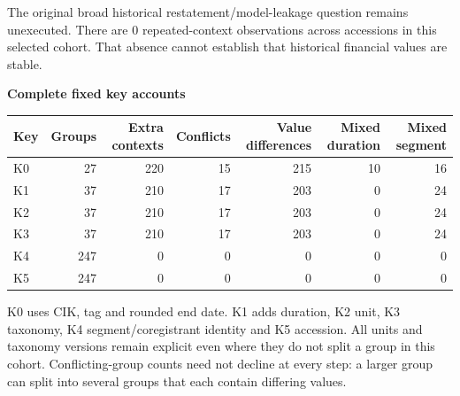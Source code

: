 \documentclass[11pt,letterpaper]{article}
\newcommand{\BoundK}{0}
\newcommand{\BoundL}{27}
\newcommand{\BoundM}{220}
\newcommand{\BoundN}{15}
\newcommand{\BoundO}{215}
\newcommand{\BoundP}{10}
\newcommand{\BoundQ}{16}
\newcommand{\BoundR}{37}
\newcommand{\BoundS}{210}
\newcommand{\BoundT}{17}
\newcommand{\BoundU}{203}
\newcommand{\BoundV}{0}
\newcommand{\BoundW}{24}
\newcommand{\BoundX}{37}
\newcommand{\BoundY}{210}
\newcommand{\BoundZ}{17}
\newcommand{\BoundAA}{203}
\newcommand{\BoundAB}{0}
\newcommand{\BoundAC}{24}
\newcommand{\BoundAD}{37}
\newcommand{\BoundAE}{210}
\newcommand{\BoundAF}{17}
\newcommand{\BoundAG}{203}
\newcommand{\BoundAH}{0}
\newcommand{\BoundAI}{24}
\newcommand{\BoundAJ}{247}
\newcommand{\BoundAK}{0}
\newcommand{\BoundAL}{0}
\newcommand{\BoundAM}{0}
\newcommand{\BoundAN}{0}
\newcommand{\BoundAO}{0}
\newcommand{\BoundAP}{247}
\newcommand{\BoundAQ}{0}
\newcommand{\BoundAR}{0}
\newcommand{\BoundAS}{0}
\newcommand{\BoundAT}{0}
\newcommand{\BoundAU}{0}
\begin{document}
The original broad historical restatement/model-leakage question remains unexecuted. There are \BoundK{} repeated-context observations across accessions in this selected cohort. That absence cannot establish that historical financial values are stable.
\newpage
{\Large\bfseries Complete fixed key accounts\par}
{\small\setlength{\tabcolsep}{5pt}
\begin{tabular}{@{}lrrrrrr@{}}\toprule
Key & Groups & Extra contexts & Conflicts & Value differences & Mixed duration & Mixed segment\\\midrule
K0 & \BoundL{} & \BoundM{} & \BoundN{} & \BoundO{} & \BoundP{} & \BoundQ{} \\
K1 & \BoundR{} & \BoundS{} & \BoundT{} & \BoundU{} & \BoundV{} & \BoundW{} \\
K2 & \BoundX{} & \BoundY{} & \BoundZ{} & \BoundAA{} & \BoundAB{} & \BoundAC{} \\
K3 & \BoundAD{} & \BoundAE{} & \BoundAF{} & \BoundAG{} & \BoundAH{} & \BoundAI{} \\
K4 & \BoundAJ{} & \BoundAK{} & \BoundAL{} & \BoundAM{} & \BoundAN{} & \BoundAO{} \\
K5 & \BoundAP{} & \BoundAQ{} & \BoundAR{} & \BoundAS{} & \BoundAT{} & \BoundAU{} \\
\bottomrule\end{tabular}}

K0 uses CIK, tag and rounded end date. K1 adds duration, K2 unit, K3 taxonomy, K4 segment/coregistrant identity and K5 accession. All units and taxonomy versions remain explicit even where they do not split a group in this cohort. Conflicting-group counts need not decline at every step: a larger group can split into several groups that each contain differing values.
\end{document}
